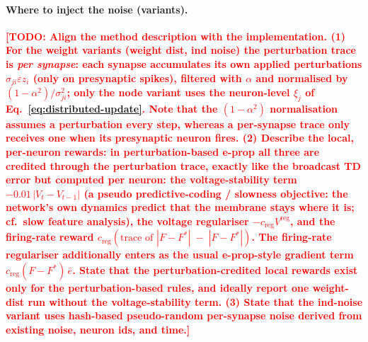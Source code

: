 \documentclass[10pt,twocolumn]{article}
\newcommand{\todo}[1]{\textcolor{red}{\bfseries[TODO: #1]}}
\newcommand{\method}{perturbation-based e-prop}   %
\begin{document}
\paragraph{Where to inject the noise (variants).}
\todo{Align the method description with the implementation. (1) For the weight
variants (weight dist, ind noise) the perturbation trace is \emph{per synapse}:
each synapse accumulates its own applied perturbations $\sigma_{ji}\varepsilon z_i$
(only on presynaptic spikes), filtered with $\alpha$ and normalised by
$(1-\alpha^2)/\sigma_{ji}^2$; only the node variant uses the neuron-level
$\xi_j$ of Eq.~\eqref{eq:distributed-update}. Note that the $(1-\alpha^2)$
normalisation assumes a perturbation every step, whereas a per-synapse trace only
receives one when its presynaptic neuron fires. (2) Describe the local,
per-neuron rewards: in \method{} all three are credited through the
perturbation trace, exactly like the broadcast TD error but computed per neuron:
the voltage-stability term $-0.01\,|V_t-V_{t-1}|$ (a pseudo predictive-coding /
slowness objective: the network's own dynamics predict that the membrane stays
where it is; cf.\ slow feature analysis), the voltage regulariser
$-c_{\mathrm{reg}}V^{\mathrm{reg}}$, and the firing-rate reward
$c_{\mathrm{reg}}(\text{trace of }|F-F^*|\;-\;|F-F^*|)$. The firing-rate
regulariser additionally enters as the usual e-prop-style gradient term
$c_{\mathrm{reg}}(F-F^*)\,\bar e$. State that the perturbation-credited local
rewards exist only for the perturbation-based rules, and ideally report one
weight-dist run without the voltage-stability term. (3) State that the ind-noise variant uses hash-based
pseudo-random per-synapse noise derived from existing noise, neuron ids, and time.}
\end{document}

